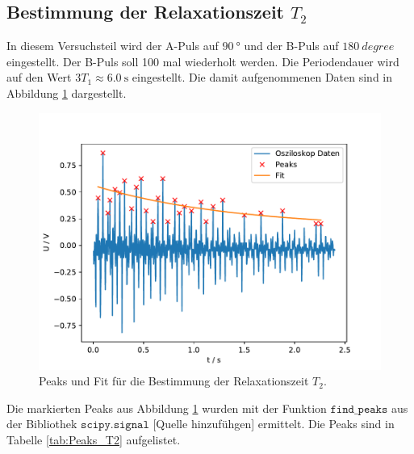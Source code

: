 \subsection{Bestimmung der Relaxationszeit $T_{\text{2}}$}
In diesem Versuchsteil wird der A-Puls auf $\SI{90}{\degree}$ und der B-Puls auf $\SI{180}{degree}$ eingestellt. Der B-Puls
soll 100 mal wiederholt werden.
Die Periodendauer wird auf den Wert $3T_{\text{1}}\approx \SI{6.0}{\second}$ eingestellt. Die damit aufgenommenen Daten sind in 
Abbildung \ref{fig:T2_Data_Fit} dargestellt.
\begin{figure}
  \centering
  \includegraphics[width = \textwidth, keepaspectratio]{figure/T2_Data_Fit.pdf}
  \caption{Peaks und Fit für die Bestimmung der Relaxationszeit $T_{\text{2}}$.}
  \label{fig:T2_Data_Fit}
\end{figure}
Die markierten Peaks aus Abbildung \ref{fig:T2_Data_Fit} wurden mit der Funktion $\texttt{find\_peaks}$ aus der Bibliothek
$\texttt{scipy.signal}$ [Quelle hinzufühgen] ermittelt.
Die Peaks sind in Tabelle \ref{tab:Peaks_T2} aufgelistet.
